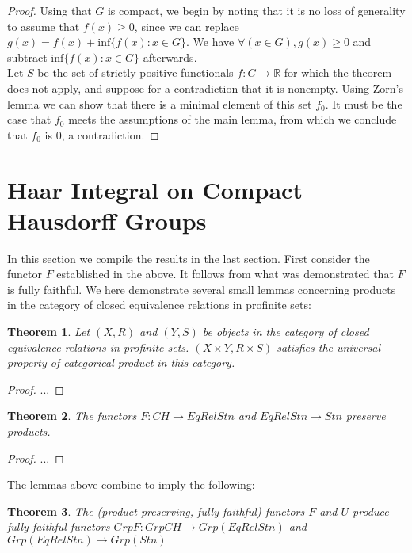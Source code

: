 \documentclass[13pt]{amsart}
\newtheorem{theorem}{Theorem}
\theoremstyle{definition}
\begin{document}
\begin{proof}
Using that $G$ is compact, we begin by noting that it is no loss of generality to assume that $f(x) \geq 0$, since we can replace $g(x) = f(x) + \text{inf} \{ f(x) : x \in G \}$. We have $\forall (x \in G),g(x) \geq 0$ and subtract $\text{inf} \{ f(x) : x \in G \}$ afterwards.\\

Let $S$ be the set of strictly positive functionals $f : G \rightarrow \mathbb{R}$ for which the theorem does not apply, and suppose for a contradiction that it is nonempty. Using Zorn's lemma we can show that there is a minimal element of this set $f_0$. It must be the case that $f_0$ meets the assumptions of the main lemma, from which we conclude that $f_0$ is $0$, a contradiction.
\end{proof}


\section{Haar Integral on Compact Hausdorff Groups}

In this section we compile the results in the last section. First consider the functor $F$ established in the above. It follows from what was demonstrated that $F$ is fully faithful. We here demonstrate several small lemmas concerning products in the category of closed equivalence relations in profinite sets:

\begin{theorem}
Let $(X, R)$ and $(Y, S)$ be objects in the category of closed equivalence relations in profinite sets. $(X \times Y, R \times S)$ satisfies the universal property of categorical product in this category.
\end{theorem}

\begin{proof}
...
\end{proof}

\begin{theorem}
The functors $F : CH \rightarrow EqRel Stn$ and $EqRel Stn \rightarrow Stn$ preserve products.
\end{theorem}

\begin{proof}
...
\end{proof}

The lemmas above combine to imply the following:

\begin{theorem}
The (product preserving, fully faithful) functors $F$ and $U$ produce fully faithful functors $Grp F : Grp CH \rightarrow Grp (EqRel Stn)$ and $Grp (EqRel Stn) \rightarrow Grp (Stn)$ 
\end{theorem}
\end{document}
